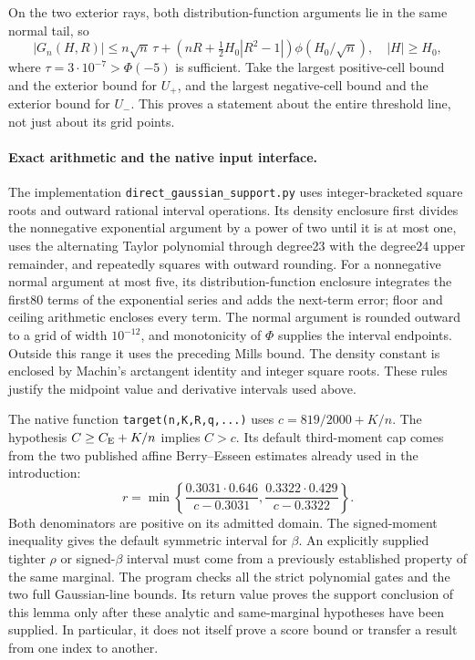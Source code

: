 On the two exterior rays, both distribution-function arguments lie
in the same normal tail, so
\[
 |G_n(H,R)|\le n\sqrt n\,\tau+
 \left(nR+\tfrac12H_0|R^2-1|\right)\phi(H_0/\sqrt n),
 \quad |H|\ge H_0,
\]
where $\tau=3\cdot10^{-7}>\Phi(-5)$ is sufficient.
Take the largest positive-cell bound and the exterior bound for
$U_+$, and the largest negative-cell bound and the exterior bound
for $U_-$. This proves a statement about the entire threshold line,
not just about its grid points.

\paragraph{Exact arithmetic and the native input interface.}
The implementation \texttt{direct\_gaussian\_support.py} uses
integer-bracketed square roots and outward rational interval operations.
Its density enclosure first divides the nonnegative exponential argument
by a power of two until it is at most one, uses the alternating Taylor
polynomial through degree23 with the degree24 upper remainder, and
repeatedly squares with outward rounding. For a nonnegative normal
argument at most five, its distribution-function enclosure integrates
the first80 terms of the exponential series and adds the next-term
error; floor and ceiling arithmetic encloses every term. The normal
argument is rounded outward to a grid of width $10^{-12}$, and
monotonicity of $\Phi$ supplies the interval endpoints. Outside this
range it uses the preceding Mills bound. The density constant is
enclosed by Machin's arctangent identity and integer square roots.
These rules justify the midpoint value and derivative intervals used
above.

The native function \texttt{target(n,K,R,q,...)} uses
$c=819/2000+K/n$. The hypothesis $C\ge C_{\mathrm E}+K/n$ implies
$C>c$. Its default third-moment cap comes from the two published
affine Berry--Esseen estimates already used in the introduction:
\[
 r=\min\left\{
 \frac{0.3031\cdot0.646}{c-0.3031},
 \frac{0.3322\cdot0.429}{c-0.3322}\right\}.
\]
Both denominators are positive on its admitted domain. The signed-moment
inequality gives the default symmetric interval for $\beta$.
An explicitly supplied tighter $\rho$ or signed-$\beta$ interval must
come from a previously established property of the same marginal.
The program checks all the strict polynomial gates and the two full
Gaussian-line bounds. Its return value proves the support conclusion
of this lemma only after these analytic and same-marginal hypotheses
have been supplied. In particular, it does not itself prove a score
bound or transfer a result from one index to another.

